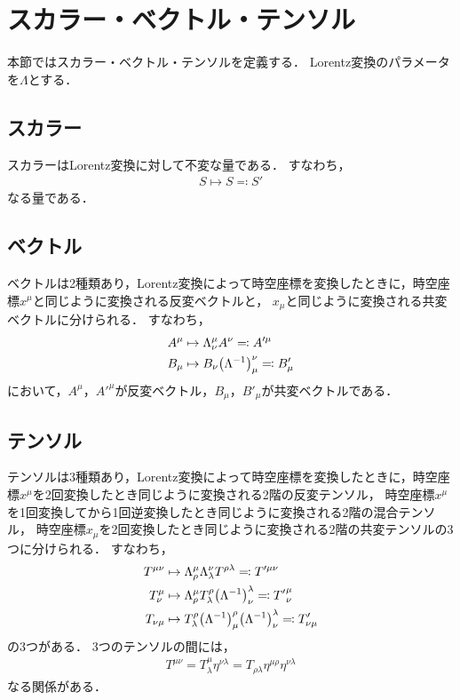 \documentclass{report}
\begin{document}
  \section{スカラー・ベクトル・テンソル}
    本節ではスカラー・ベクトル・テンソルを定義する．
    Lorentz変換のパラメータを$\Lambda$とする．
    \subsection{スカラー}
      スカラーはLorentz変換に対して不変な量である．
      すなわち，
      \begin{align}
        S \mapsto S \eqqcolon S'
      \end{align}
      なる量である．
    \subsection{ベクトル}
      ベクトルは2種類あり，Lorentz変換によって時空座標を変換したときに，時空座標$x^{\mu}$と同じように変換される反変ベクトルと，
      $x_{\mu}$と同じように変換される共変ベクトルに分けられる．
      すなわち，
      \begin{align}
        A^{\mu} &\mapsto \Lambda_{\nu}^{\mu}A^{\nu} \eqqcolon A'^{\mu} \\ 
        B_{\mu} &\mapsto B_{\nu}\qty(\Lambda^{-1})_{\mu}^{\nu} \eqqcolon B'_{\mu}
      \end{align}
      において，$A^{\mu}$，$A'^{\mu}$が反変ベクトル，$B_{\mu}$，$B'_{\mu}$が共変ベクトルである．
    \subsection{テンソル}
      テンソルは3種類あり，Lorentz変換によって時空座標を変換したときに，時空座標$x^{\mu}$を2回変換したとき同じように変換される2階の反変テンソル，
      時空座標$x^{\mu}$を1回変換してから1回逆変換したとき同じように変換される2階の混合テンソル，
      時空座標$x_{\mu}$を2回変換したとき同じように変換される2階の共変テンソルの3つに分けられる．
      すなわち，
      \begin{align}
        T^{\mu\nu} &\mapsto \Lambda_{\rho}^{\mu}\Lambda_{\lambda}^{\nu}T^{\rho\lambda} \eqqcolon T'^{\mu\nu} \\ 
        T_{\nu}^{\mu} &\mapsto \Lambda_{\rho}^{\mu}T_{\lambda}^{\rho}\qty(\Lambda^{-1})_{\nu}^{\lambda} \eqqcolon {T'}_{\nu}^{\mu} \\ 
        T_{\nu\mu} &\mapsto T_{\lambda}^{\rho}\qty(\Lambda^{-1})_{\mu}^{\rho}\qty(\Lambda^{-1})_{\nu}^{\lambda} \eqqcolon T'_{\nu\mu}
      \end{align}
      の3つがある．
      3つのテンソルの間には，
      \begin{align}
        T^{\mu\nu} = T_{\lambda}^{\mu}\eta^{\nu\lambda} = T_{\rho\lambda}\eta^{\mu\rho}\eta^{\nu\lambda}
      \end{align}
      なる関係がある．
\end{document}
